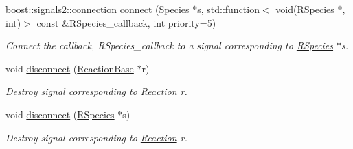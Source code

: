 \begin{DoxyCompactItemize}
boost\-::signals2\-::connection \hyperlink{classchem_1_1ChemSignal_a74cb3a95f3f9793f4a0343180aa01074}{connect} (\hyperlink{classchem_1_1Species}{Species} $\ast$s, std\-::function$<$ void(\hyperlink{classchem_1_1RSpecies}{R\-Species} $\ast$, int)$>$ const \&R\-Species\-\_\-callback, int priority=5)
\begin{DoxyCompactList}\small\item\em Connect the callback, R\-Species\-\_\-callback to a signal corresponding to \hyperlink{classchem_1_1RSpecies}{R\-Species} $\ast$s. \end{DoxyCompactList}\item 
void \hyperlink{classchem_1_1ChemSignal_ac1484774e9bf4a0e93999a4061d5a97c}{disconnect} (\hyperlink{classchem_1_1ReactionBase}{Reaction\-Base} $\ast$r)
\begin{DoxyCompactList}\small\item\em Destroy signal corresponding to \hyperlink{classchem_1_1Reaction}{Reaction} r. \end{DoxyCompactList}\item 
void \hyperlink{classchem_1_1ChemSignal_a546b0feb4e8a50ae0e3833ede8d9faee}{disconnect} (\hyperlink{classchem_1_1RSpecies}{R\-Species} $\ast$s)
\begin{DoxyCompactList}\small\item\em Destroy signal corresponding to \hyperlink{classchem_1_1Reaction}{Reaction} r. \end{DoxyCompactList}\end{DoxyCompactItemize}
